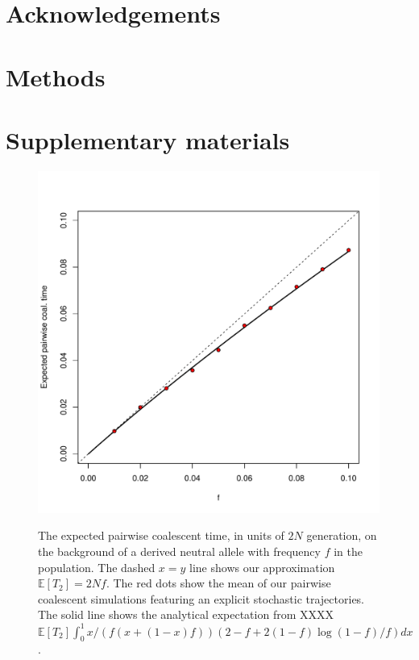 \documentclass[a4paper,10pt]{article}
\begin{document}
\section{Acknowledgements}

\section{Methods}





\section{Supplementary materials}

\setcounter{table}{0}
\renewcommand{\thetable}{S\arabic{table}}
\setcounter{figure}{0}
\renewcommand{\thefigure}{S\arabic{figure}}


\begin{figure}
	\includegraphics[width = \textwidth]{../Paper_Figures/n_two_coal_time.pdf} \label{n_2_supp_plot}
\caption{The expected pairwise coalescent time, in units of $2N$ generation, on the background of a derived neutral allele with frequency $f$ in the population.  The dashed $x=y$ line shows our approximation $\mathbb{E}  [T_2]=2Nf$. The red dots show the mean of our pairwise coalescent simulations featuring an explicit stochastic trajectories. The solid line shows the analytical expectation from XXXX  
$\mathbb{E} [T_2] \int_0^1 x/(f (x+(1-x)f))(2-f+2(1-f) \log(1-f)/f) dx $.}
\end{figure}   %
\end{document}
